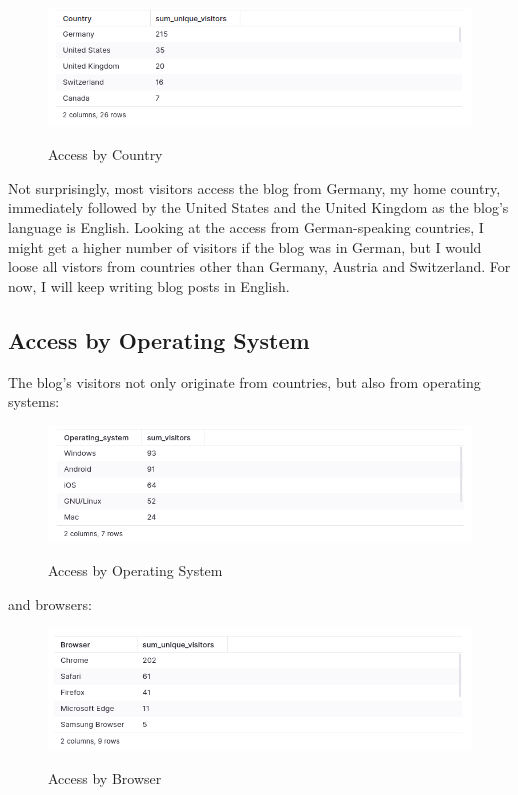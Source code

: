 \begin{figure}[H]
\centering
\caption {Access by Country}
\includegraphics[width=\linewidth]{images/access-country.png}
\label{fig:accessCountry}
\end{figure}

Not surprisingly, most visitors access the blog from Germany, my home country, immediately followed by the United States and the United Kingdom as the blog's language is English. Looking at the access from German-speaking countries, I might get a higher number of visitors if the blog was in German, but I would loose all vistors from countries other than Germany, Austria and Switzerland. For now, I will keep writing blog posts in English.

\subsection{Access by Operating System}

The blog's visitors not only originate from countries, but also from operating systems:

\begin{figure}[H]
\centering
\caption {Access by Operating System}
\includegraphics[width=\linewidth]{images/access-os.png}
\label{fig:accessOS}
\end{figure}

and browsers:

\begin{figure}[H]
\centering
\caption {Access by Browser}
\includegraphics[width=\linewidth]{images/access-browser.png}
\label{fig:accessBrowser}
\end{figure}

